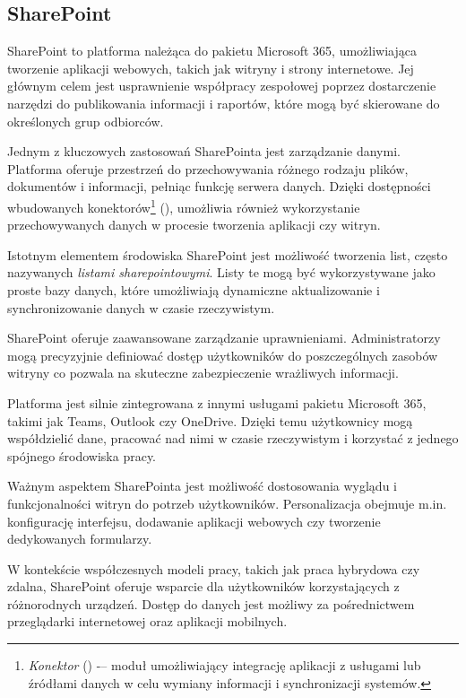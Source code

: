 \subsection{SharePoint \texorpdfstring{\cite{maggierui_introduction_2024}}{}}
SharePoint to platforma należąca do pakietu Microsoft 365, umożliwiająca tworzenie aplikacji webowych, takich jak witryny i strony internetowe. Jej głównym celem jest usprawnienie współpracy zespołowej poprzez dostarczenie narzędzi do publikowania informacji i raportów, które mogą być skierowane do określonych grup odbiorców. \par
Jednym z kluczowych zastosowań SharePointa jest zarządzanie danymi. Platforma oferuje przestrzeń do przechowywania różnego rodzaju plików, dokumentów i informacji, pełniąc funkcję serwera danych. Dzięki dostępności wbudowanych konektorów\footnote{\emph{Konektor} () -– moduł umożliwiający integrację aplikacji z usługami lub źródłami danych w celu wymiany informacji i synchronizacji systemów.} (), umożliwia również wykorzystanie przechowywanych danych w procesie tworzenia aplikacji czy witryn. \par
Istotnym elementem środowiska SharePoint jest możliwość tworzenia list, często nazywanych \emph{listami sharepointowymi}. Listy te mogą być wykorzystywane jako proste bazy danych, które umożliwiają dynamiczne aktualizowanie i synchronizowanie danych w czasie rzeczywistym. \par
SharePoint oferuje zaawansowane zarządzanie uprawnieniami. Administratorzy mogą precyzyjnie definiować dostęp użytkowników do poszczególnych zasobów witryny co pozwala na skuteczne zabezpieczenie wrażliwych informacji. \par
Platforma jest silnie zintegrowana z innymi usługami pakietu Microsoft 365, takimi jak Teams, Outlook czy OneDrive. Dzięki temu użytkownicy mogą współdzielić dane, pracować nad nimi w czasie rzeczywistym i korzystać z jednego spójnego środowiska pracy. \par
Ważnym aspektem SharePointa jest możliwość dostosowania wyglądu i funkcjonalności witryn do potrzeb użytkowników. Personalizacja obejmuje m.in. konfigurację interfejsu, dodawanie aplikacji webowych czy tworzenie dedykowanych formularzy. \par
W kontekście współczesnych modeli pracy, takich jak praca hybrydowa czy zdalna, SharePoint oferuje wsparcie dla użytkowników korzystających z różnorodnych urządzeń. Dostęp do danych jest możliwy za pośrednictwem przeglądarki internetowej oraz aplikacji mobilnych.
